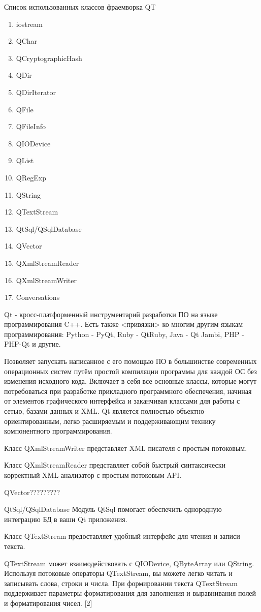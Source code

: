 Список использованных классов фраемворка QT
 \begin{enumerate}
\item iostream
\item QChar
\item QCryptographicHash
\item QDir
\item QDirIterator
\item QFile
\item QFileInfo
\item QIODevice
\item QList
\item QRegExp
\item QString
\item QTextStream
\item QtSql/QSqlDatabase
\item QVector
\item QXmlStreamReader
\item QXmlStreamWriter
\item Conversations
\end{enumerate}

Qt - кросс-платформенный инструментарий разработки ПО на языке программирования C++. Есть также <привязки> ко многим другим языкам программирования: Python - PyQt, Ruby - QtRuby, Java - Qt Jambi, PHP - PHP-Qt и другие.

Позволяет запускать написанное с его помощью ПО в большинстве современных операционных систем путём простой компиляции программы для каждой ОС без изменения исходного кода. Включает в себя все основные классы, которые могут потребоваться при разработке прикладного программного обеспечения, начиная от элементов графического интерфейса и заканчивая классами для работы с сетью, базами данных и XML. Qt является полностью объектно-ориентированным, легко расширяемым и поддерживающим технику компонентного программирования.

Класс QXmlStreamWriter представляет XML писателя с простым потоковым.

Класс QXmlStreamReader представляет собой быстрый синтаксически корректный XML анализатор с простым потоковым API. 

QVector?????????

QtSql/QSqlDatabase
Модуль QtSql помогает обеспечить однородную интеграцию БД в ваши Qt приложения.


Класс QTextStream предоставляет удобный интерфейс для чтения и записи текста.

QTextStream может взаимодействовать с QIODevice, QByteArray или QString. Используя потоковые операторы QTextStream, вы можете легко читать и записывать слова, строки и числа. При формировании текста QTextStream поддерживает параметры форматирования для заполнения и выравнивания полей и форматирования чисел. [2]

